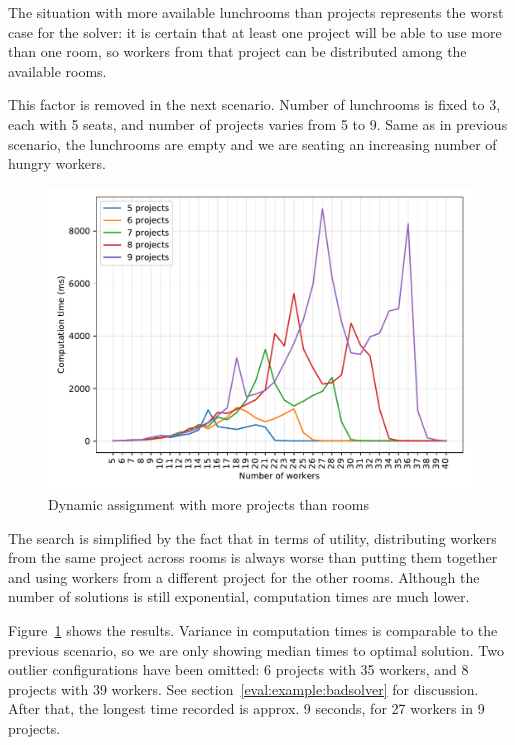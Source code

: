 \medskip

The situation with more available lunchrooms than projects represents the worst case for
the solver: it is certain that at least one project will be able to use more than one
room, so workers from that project can be distributed among the available rooms.

This factor is removed in the next scenario. Number of lunchrooms is fixed to 3, each
with 5 seats, and number of projects varies from 5 to 9. Same as in previous scenario,
the lunchrooms are empty and we are seating an increasing number of hungry workers.

\begin{figure}[ht]
    \centering
    \includegraphics[width=1\linewidth]{img/workers-moreprojects.pdf}
    \caption{Dynamic assignment with more projects than rooms}
    \label{fig:workers-moreprojects}
\end{figure}

The search is simplified by the fact that in terms of utility, distributing workers from
the same project across rooms is always worse than putting them together and using
workers from a different project for the other rooms. Although the number of solutions
is still exponential, computation times are much lower.

Figure~\ref{fig:workers-moreprojects} shows the results. Variance in computation times
is comparable to the previous scenario, so we are only showing median times to optimal
solution. Two outlier configurations have been omitted: 6 projects with 35 workers, and
8 projects with 39 workers. See section~\ref{eval:example:badsolver} for discussion.
After that, the longest time recorded is approx. 9 seconds, for 27 workers in 9
projects.

